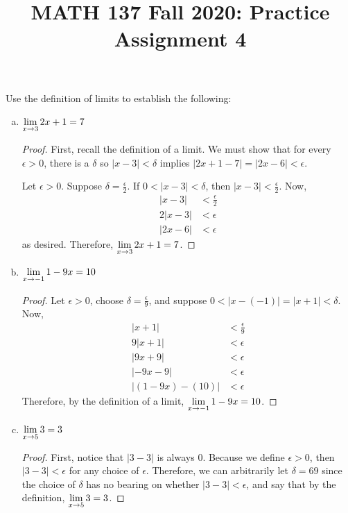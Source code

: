 
\title{MATH 137 Fall 2020: Practice Assignment 4}


\thispagestyle{firstpage}

\textbf{\@title}

\question Use the \epsdel{} definition of limits to establish the following:
\begin{enumerate}[(a)]
  \item $\displaystyle\lim_{x\to3} 2x+1 = 7$
        \begin{proof}
          First, recall the \epsdel{} definition of a limit.
          We must show that for every $\epsilon > 0$, there is a $\delta$ so $|x-3|<\delta$ implies $|2x+1-7|=|2x-6|<\epsilon$.

          Let $\epsilon > 0$.
          Suppose $\delta = \frac{\epsilon}{2}$.
          If $0 < |x-3|<\delta$, then $|x-3|<\frac{\epsilon}{2}$. Now,
          \begin{align*}
            |x-3|  & < \frac{\epsilon}{2} \\
            2|x-3| & < \epsilon           \\
            |2x-6| & < \epsilon
          \end{align*}
          as desired. Therefore, $\displaystyle\lim_{x\to3} 2x+1 = 7$.
        \end{proof}
  \item $\displaystyle\lim_{x\to-1} 1-9x= 10$
        \begin{proof}
          Let $\epsilon > 0$, choose $\delta = \frac{\epsilon}{9}$, and suppose $0 < |x-(-1)| = |x+1| < \delta$. Now,
          \begin{align*}
            |x+1|           & < \frac{\epsilon}{9} \\
            9|x+1|          & < \epsilon           \\
            |9x+9|          & < \epsilon           \\
            |-9x-9|         & < \epsilon           \\
            |(1-9x) - (10)| & < \epsilon
          \end{align*}
          Therefore, by the \epsdel{} definition of a limit, $\displaystyle\lim_{x\to-1} 1-9x = 10$.
        \end{proof}
  \item $\displaystyle\lim_{x\to5} 3 = 3$
        \begin{proof}
          First, notice that $|3-3|$ is always 0.
          Because we define $\epsilon > 0$, then $|3-3| < \epsilon$ for any choice of $\epsilon$.
          Therefore, we can arbitrarily let $\delta = 69$ since the choice of $\delta$ has no bearing on whether $|3-3| < \epsilon$, and say that by the \epsdel{} definition, $\displaystyle\lim_{x\to5} 3 = 3$.

\end{proof}
\end{enumerate}
